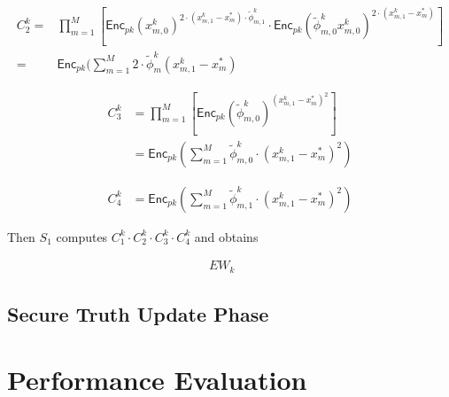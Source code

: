 \documentclass[conference]{IEEEtran}
\begin{document}
\begin{equation}
  \begin{split}
  C_2^k = & \prod_{m=1}^M\left[ \mathsf{Enc}_{pk}(x_{m,0}^k)^{2\cdot (x_{m,1}^k - x_m^*)\cdot \tilde{\phi}_{m,1}^k} \cdot \mathsf{Enc}_{pk}(\tilde{\phi}_{m,0}^k x_{m,0}^k)^{2\cdot (x_{m,1}^k - x_m^*)} \right] \\
      = & \mathsf{Enc}_{pk}(\sum_{m=1}^M 2\cdot\tilde{\phi}_m^k (x_{m,1}^k-x_m^*)
  \end{split}
\end{equation}

\begin{equation}
  \begin{split}
    C_3^k & = \prod_{m=1}^M\left[ \mathsf{Enc}_{pk}(\tilde{\phi}_{m,0}^k)^{(x_{m,1}^k - x_m^*)^2} \right] \\
    & = \mathsf{Enc}_{pk}(\sum_{m=1}^M \tilde{\phi}_{m,0}^k \cdot (x_{m,1}^k - x_m^*)^2)
  \end{split}
\end{equation}


\begin{equation}
  \begin{split}
    C_4^k & = \mathsf{Enc}_{pk}(\sum_{m=1}^M \tilde{\phi}_{m,1}^k \cdot (x_{m,1}^k - x_m^*)^2)
  \end{split}
\end{equation}

Then $S_1$ computes $C_1^k\cdot C_2^k\cdot C_3^k \cdot C_4^k$ and obtains 

\begin{equation}
  \begin{split}
    EW_k  \mathrel{\phantom{=}}
  \end{split}
\end{equation}

\subsection{Secure Truth Update Phase}


\section{Performance Evaluation}




\vspace{12pt}
\end{document}
